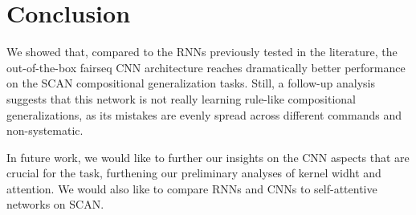 \section{Conclusion}

We showed that, compared to the RNNs previously tested in the
literature, the out-of-the-box fairseq CNN architecture reaches
dramatically better performance on the SCAN compositional
generalization tasks. Still, a follow-up analysis suggests that this
network is not really learning rule-like compositional
generalizations, as its mistakes are evenly spread across different
commands and non-systematic.

In future work, we would like to further our insights on the CNN
aspects that are crucial for the task, furthening our preliminary
analyses of kernel widht and attention. We would also like to compare
RNNs and CNNs to self-attentive networks on SCAN.


